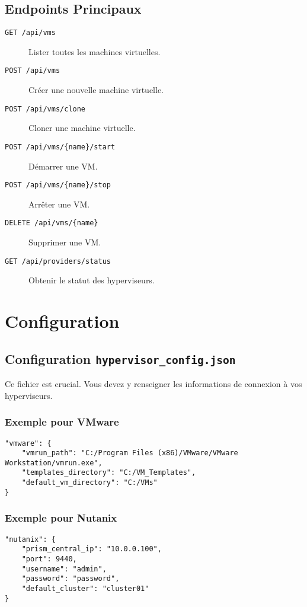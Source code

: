 \documentclass[11pt,a4paper]{article}
\begin{document}
\subsection{Endpoints Principaux}
\begin{description}
    \item[\texttt{GET /api/vms}] Lister toutes les machines virtuelles.
    \item[\texttt{POST /api/vms}] Créer une nouvelle machine virtuelle.
    \item[\texttt{POST /api/vms/clone}] Cloner une machine virtuelle.
    \item[\texttt{POST /api/vms/\{name\}/start}] Démarrer une VM.
    \item[\texttt{POST /api/vms/\{name\}/stop}] Arrêter une VM.
    \item[\texttt{DELETE /api/vms/\{name\}}] Supprimer une VM.
    \item[\texttt{GET /api/providers/status}] Obtenir le statut des hyperviseurs.
\end{description}

\section{Configuration}

\subsection{Configuration \texttt{hypervisor\_config.json}}
Ce fichier est crucial. Vous devez y renseigner les informations de connexion à vos hyperviseurs.

\subsubsection{Exemple pour VMware}
\begin{lstlisting}[style=jsonblue]
"vmware": {
    "vmrun_path": "C:/Program Files (x86)/VMware/VMware Workstation/vmrun.exe",
    "templates_directory": "C:/VM_Templates",
    "default_vm_directory": "C:/VMs"
}
\end{lstlisting}

\subsubsection{Exemple pour Nutanix}
\begin{lstlisting}[style=jsonblue]
"nutanix": {
    "prism_central_ip": "10.0.0.100",
    "port": 9440,
    "username": "admin",
    "password": "password",
    "default_cluster": "cluster01"
}
\end{lstlisting}
\end{document}
